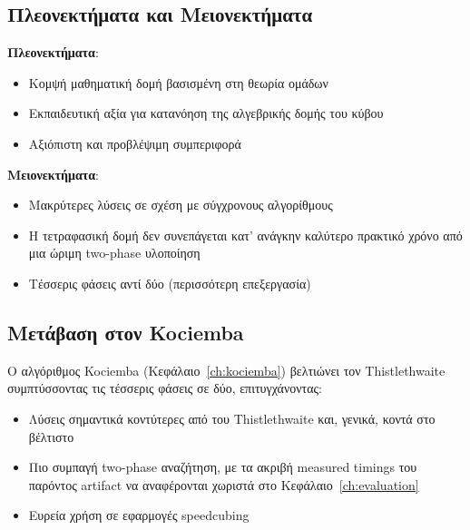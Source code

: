 \subsection{Πλεονεκτήματα και Μειονεκτήματα}

\textbf{Πλεονεκτήματα}:
\begin{itemize}
    \item Κομψή μαθηματική δομή βασισμένη στη θεωρία ομάδων
    \item Εκπαιδευτική αξία για κατανόηση της αλγεβρικής δομής του κύβου
    \item Αξιόπιστη και προβλέψιμη συμπεριφορά
\end{itemize}

\textbf{Μειονεκτήματα}:
\begin{itemize}
    \item Μακρύτερες λύσεις σε σχέση με σύγχρονους αλγορίθμους
    \item Η τετραφασική δομή δεν συνεπάγεται κατ' ανάγκην καλύτερο πρακτικό χρόνο από μια ώριμη two-phase υλοποίηση
    \item Τέσσερις φάσεις αντί δύο (περισσότερη επεξεργασία)
\end{itemize}

\subsection{Μετάβαση στον Kociemba}

Ο αλγόριθμος Kociemba (Κεφάλαιο~\ref{ch:kociemba}) βελτιώνει τον Thistlethwaite συμπτύσσοντας τις τέσσερις φάσεις σε δύο, επιτυγχάνοντας:
\begin{itemize}
    \item Λύσεις σημαντικά κοντύτερες από του Thistlethwaite και, γενικά, κοντά στο βέλτιστο
    \item Πιο συμπαγή two-phase αναζήτηση, με τα ακριβή measured timings του παρόντος artifact να αναφέρονται χωριστά στο Κεφάλαιο~\ref{ch:evaluation}
    \item Ευρεία χρήση σε εφαρμογές speedcubing
\end{itemize}
